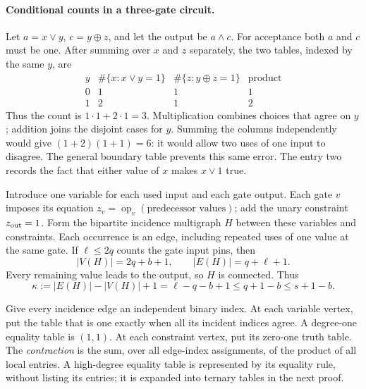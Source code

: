 \documentclass[11pt]{article}
\begin{document}
\paragraph{Conditional counts in a three-gate circuit.}
Let $a=x\lor y$, $c=y\oplus z$, and let the output be $a\land c$.
For acceptance both $a$ and $c$ must be one. After summing over $x$
and $z$ separately, the two tables, indexed by the same $y$, are
\[
\begin{array}{c|cc|c}
y&\#\{x:x\lor y=1\}&\#\{z:y\oplus z=1\}&\text{product}\\\hline
0&1&1&1\\
1&2&1&2
\end{array}
\]
Thus the count is $1\cdot1+2\cdot1=3$. Multiplication combines
choices that agree on $y$; addition joins the disjoint cases for $y$.
Summing the columns independently would give $(1+2)(1+1)=6$:
it would allow two uses of one input to disagree. The general boundary
table prevents this same error. The entry two records the fact that
either value of $x$ makes $x\lor1$ true.

Introduce one variable for each used input and each gate output.
Each gate $v$ imposes its equation
$z_v=\operatorname{op}_v(\text{predecessor values})$; add the unary
constraint $z_{\rm out}=1$. Form the bipartite incidence multigraph
$H$ between these variables and constraints. Each occurrence is an
edge, including repeated uses of one value at the same gate.
If $\ell\le2q$ counts the gate input pins, then
\[
 |V(H)|=2q+b+1,\qquad |E(H)|=q+\ell+1.
\]
Every remaining value leads to the output, so $H$ is connected. Thus
\begin{equation}\label{eq:budget}
 \kappa:=|E(H)|-|V(H)|+1
       =\ell-q-b+1\le q+1-b\le s+1-b.
\end{equation}

Give every incidence edge an independent binary index. At each
variable vertex, put the table that is one exactly when all its
incident indices agree. A degree-one equality table is $(1,1)$.
At each constraint vertex, put its zero-one truth table. The
\emph{contraction} is the sum, over all edge-index assignments, of
the product of all local entries. A high-degree equality table is
represented by its equality rule, without listing its entries;
it is expanded into ternary tables in the next proof.
\end{document}
